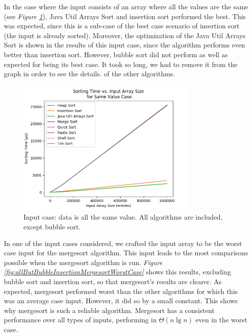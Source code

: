 In the case where the input consists of an array where all the values are the same (see \textit{Figure \ref{fig:allButBubbleSameValue}}), Java Util Arrays Sort and insertion sort performed the best. This was expected, since this is a sub-case of the best case scenario of insertion sort (the input is already sorted). Moreover, the optimization of the Java Util Arrays Sort is shown in the results of this input case, since the algorithm performs even better than insertion sort. However, bubble sort did not perform as well as expected for being its best case. It took so long, we had to remove it from the graph in order to see the details. of the other algorithms.

\begin{figure}[!ht]
\centering
\includegraphics[width=9cm]{figures/plots_without_BubbleSort/sorting_time_vs_input_array_size_SameValueCase.png}
\caption{Input case: data is all the same value. All algorithms are included, except bubble sort.}
\label{fig:allButBubbleSameValue}
\end{figure}

In one of the input cases considered, we crafted the input array to be the worst case input for the mergesort algorithm. This input leads to the most comparisons possible when the mergesort algorithm is run. \textit{Figure \ref{fig:allButBubbleInsertionMergesortWorstCase}} shows this results, excluding bubble sort and insertion sort, so that mergesort's results are clearer. As expected, mergesort performed worst than the other algorithms for which this was an average case input. However, it did so by a small constant. This shows why mergesort is such a reliable algorithm. Mergesort has a consistent performance over all types of inputs, performing in $\Theta(n \lg n)$ even in the worst case.

